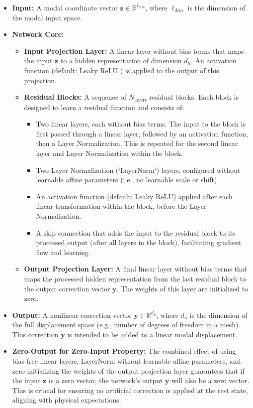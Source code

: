 \begin{itemize}
    \item \textbf{Input:} A modal coordinate vector \( \mathbf{z} \in \mathbb{R}^{\ell_{dim}} \), where \(\ell_{dim}\) is the dimension of the modal input space.
    \item \textbf{Network Core:}
    \begin{itemize}
        \item \textbf{Input Projection Layer:} A linear layer without bias terms that maps the input \( \mathbf{z} \) to a hidden representation of dimension \(d_h\). An activation function (default: Leaky ReLU \cite{xu2015empiricalevaluationrectifiedactivations}) is applied to the output of this projection.
        \item \textbf{Residual Blocks:} A sequence of \(N_{\text{layers}}\) residual blocks. Each block is designed to learn a residual function and consists of:
        \begin{itemize}
            \item Two linear layers, each without bias terms. The input to the block is first passed through a linear layer, followed by an activation function, then a Layer Normalization. This is repeated for the second linear layer and Layer Normalization within the block.
            \item Two Layer Normalization (`LayerNorm`) layers, configured without learnable affine parameters (i.e., no learnable scale or shift).
            \item An activation function (default: Leaky ReLU) applied after each linear transformation within the block, before the Layer Normalization.
            \item A skip connection that adds the input to the residual block to its processed output (after all layers in the block), facilitating gradient flow and learning.
        \end{itemize}
        \item \textbf{Output Projection Layer:} A final linear layer without bias terms that maps the processed hidden representation from the last residual block to the output correction vector \( \bm{y} \). The weights of this layer are initialized to zero.
        \end{itemize}
        \item \textbf{Output:} A nonlinear correction vector \( \bm{y} \in \mathbb{R}^{d_u} \), where \(d_u\) is the dimension of the full displacement space (e.g., number of degrees of freedom in a mesh). This correction \( \bm{y} \) is intended to be added to a linear modal displacement.
        \item \textbf{Zero-Output for Zero-Input Property:} The combined effect of using bias-free linear layers, LayerNorm without learnable affine parameters, and zero-initializing the weights of the output projection layer guarantees that if the input \( \mathbf{z} \) is a zero vector, the network's output \( \bm{y} \) will also be a zero vector. This is crucial for ensuring no artificial correction is applied at the rest state, aligning with physical expectations.
    \end{itemize}




